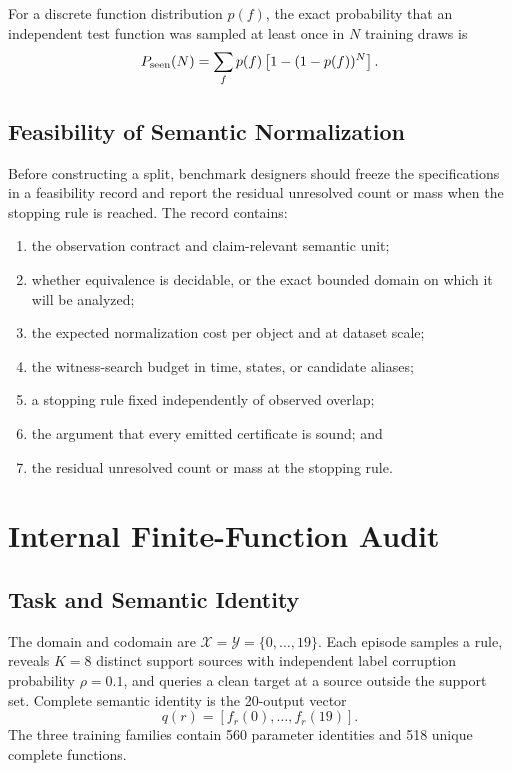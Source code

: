 For a discrete function distribution $p(f)$, the exact probability that an
independent test function was sampled at least once in $N$ training draws is
\begin{equation}
P_{\rm seen}(N)=
\sum_f p(f)\left[1-(1-p(f))^N\right].
\label{eq:supp-coverage}
\end{equation}

\subsection{Feasibility of Semantic Normalization}
\label{app:normalization-feasibility}

Before constructing a split, benchmark designers should freeze the
specifications in a feasibility record and report the residual unresolved
count or mass when the stopping rule is reached.  The record contains:
\begin{enumerate}
    \item the observation contract and claim-relevant semantic unit;
    \item whether equivalence is decidable, or the exact bounded domain on
    which it will be analyzed;
    \item the expected normalization cost per object and at dataset scale;
    \item the witness-search budget in time, states, or candidate aliases;
    \item a stopping rule fixed independently of observed overlap;
    \item the argument that every emitted certificate is sound; and
    \item the residual unresolved count or mass at the stopping rule.
\end{enumerate}

\section{Internal Finite-Function Audit}

\subsection{Task and Semantic Identity}

The domain and codomain are
$\mathcal X=\mathcal Y=\{0,\ldots,19\}$.  Each episode samples a rule,
reveals $K=8$ distinct support sources with independent label corruption
probability $\rho=0.1$, and queries a clean target at a source outside the
support set.  Complete semantic identity is the 20-output vector
\begin{equation}
q(r)=[f_r(0),\ldots,f_r(19)].
\end{equation}
The three training families contain 560 parameter identities and 518 unique
complete functions.

